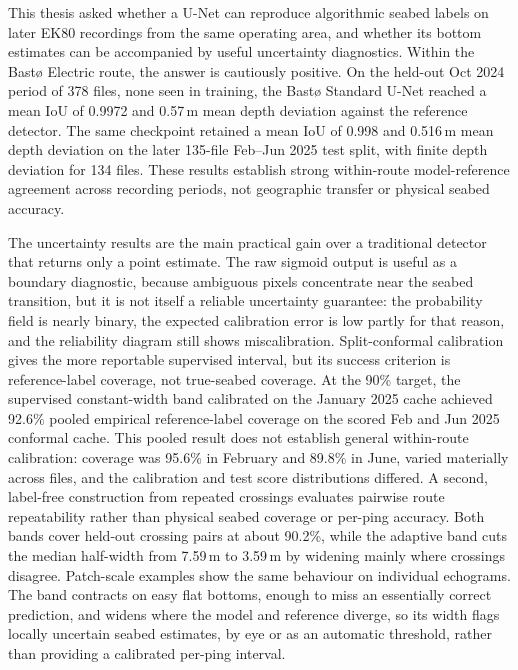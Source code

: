 \label{chap:conclusion}

This thesis asked whether a U-Net can reproduce algorithmic seabed labels on later EK80 recordings from the same operating area, and whether its bottom estimates can be accompanied by useful uncertainty diagnostics. Within the Bast\o{} Electric route, the answer is cautiously positive. On the held-out Oct 2024 period of 378 files, none seen in training, the Bast\o{} Standard U-Net reached a mean IoU of 0.9972 and 0.57\,m mean depth deviation against the reference detector. The same checkpoint retained a mean IoU of 0.998 and 0.516\,m mean depth deviation on the later 135-file Feb--Jun 2025 test split, with finite depth deviation for 134 files. These results establish strong within-route model-reference agreement across recording periods, not geographic transfer or physical seabed accuracy.

The uncertainty results are the main practical gain over a traditional detector that returns only a point estimate. The raw sigmoid output is useful as a boundary diagnostic, because ambiguous pixels concentrate near the seabed transition, but it is not itself a reliable uncertainty guarantee: the probability field is nearly binary, the expected calibration error is low partly for that reason, and the reliability diagram still shows miscalibration. Split-conformal calibration gives the more reportable supervised interval, but its success criterion is reference-label coverage, not true-seabed coverage. At the 90\% target, the supervised constant-width band calibrated on the January 2025 cache achieved 92.6\% pooled empirical reference-label coverage on the scored Feb and Jun 2025 conformal cache. This pooled result does not establish general within-route calibration: coverage was 95.6\% in February and 89.8\% in June, varied materially across files, and the calibration and test score distributions differed. A second, label-free construction from repeated crossings evaluates pairwise route repeatability rather than physical seabed coverage or per-ping accuracy. Both bands cover held-out crossing pairs at about 90.2\%, while the adaptive band cuts the median half-width from 7.59\,m to 3.59\,m by widening mainly where crossings disagree. Patch-scale examples show the same behaviour on individual echograms. The band contracts on easy flat bottoms, enough to miss an essentially correct prediction, and widens where the model and reference diverge, so its width flags locally uncertain seabed estimates, by eye or as an automatic threshold, rather than providing a calibrated per-ping interval.

